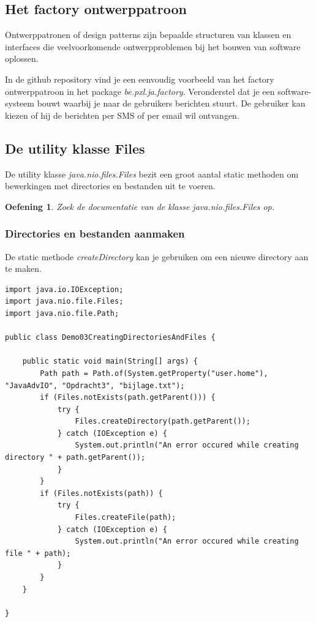 \documentclass{tstextbook}
\newtheorem{envoefening}{Oefening}[chapter]
\newenvironment{oefening}
               {\begin{boxexercise}\begin{envoefening}}
               {\end{envoefening}\end{boxexercise}}
\begin{document}
\subsection{Het factory ontwerppatroon}

Ontwerppatronen of design patterns zijn bepaalde structuren van klassen en interfaces die veelvoorkomende ontwerpproblemen bij het bouwen van software oplossen.

In de github repository vind je een eenvoudig voorbeeld van het factory ontwerppatroon in het package \textit{be.pxl.ja.factory}.
Veronderstel dat je een software-systeem bouwt waarbij je naar de gebruikers berichten stuurt. De gebruiker kan kiezen of hij de berichten per SMS of per email wil ontvangen. 


\subsection{De utility klasse Files}

De utility klasse \textit{java.nio.files.Files} bezit een groot aantal static methoden om bewerkingen met directories en bestanden uit te voeren.

\begin{oefening}
Zoek de documentatie van de klasse java.nio.files.Files op.
\end{oefening}

\subsubsection{Directories en bestanden aanmaken}

De static methode \textit{createDirectory} kan je gebruiken om een nieuwe directory aan te maken. 


\begin{lstlisting}
import java.io.IOException;
import java.nio.file.Files;
import java.nio.file.Path;

public class Demo03CreatingDirectoriesAndFiles {

	public static void main(String[] args) {
		Path path = Path.of(System.getProperty("user.home"), "JavaAdvIO", "Opdracht3", "bijlage.txt");
		if (Files.notExists(path.getParent())) {
			try {
				Files.createDirectory(path.getParent());
			} catch (IOException e) {
				System.out.println("An error occured while creating directory " + path.getParent());
			}
		}
		if (Files.notExists(path)) {
			try {
				Files.createFile(path);
			} catch (IOException e) {
				System.out.println("An error occured while creating file " + path);
			}
		}
	}

}
\end{lstlisting}
\end{document}
